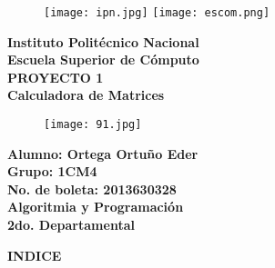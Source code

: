 \documentclass[letterpaper]{article}
\begin{document}
\pagestyle{empty}

\begin{figure}
	\texttt{[image: ipn.jpg]}
	\hspace{12.5cm}
	\texttt{[image: escom.png]}
\end{figure}

\begin{center}
\textbf{\LARGE Instituto Polit\'ecnico Nacional\\} %
\textbf{\Large Escuela Superior de C\'omputo\\}
\vspace{0.9cm}
\textbf{\LARGE PROYECTO 1\\}
\textbf{\Large Calculadora de Matrices\\}
\vspace{0.5cm}
\end{center}

\begin{center}
\begin{figure}[H] %
	\hspace{3cm}\texttt{[image: 91.jpg]}
\end{figure}
\end{center}

\begin{center}
\textbf{\Large Alumno: Ortega Ortu\~no Eder\\} %
\textbf{\Large Grupo: 1CM4\\}
\textbf{\Large No. de boleta: 2013630328\\}
\vspace{0.9cm}
\textbf{\LARGE Algoritmia y Programaci\'on\\}
\textbf{\Large 2do. Departamental\\}
\end{center}

\clearpage

\begin{center}
\textbf{\LARGE INDICE\\}
\vspace{1.0cm}
\end{center}
\end{document}
